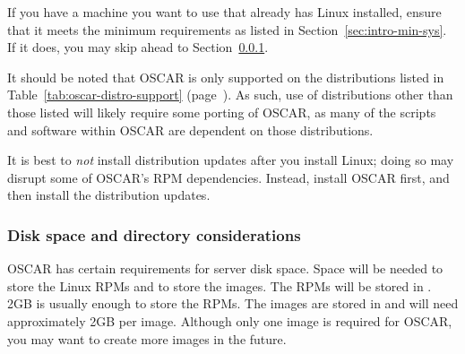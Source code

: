 If you have a machine you want to use that already has Linux
installed, ensure that it meets the minimum requirements as listed in
Section~\ref{sec:intro-min-sys}.  If it does, you may skip ahead to
Section~\ref{det:serverdiskpar}.

It should be noted that OSCAR is only supported on the distributions
listed in Table~\ref{tab:oscar-distro-support}
(page~\pageref{tab:oscar-distro-support}).  As such, use of
distributions other than those listed will likely require some porting
of OSCAR, as many of the scripts and software within OSCAR are
dependent on those distributions.


It is best to {\em not} install distribution updates after you install
Linux; doing so may disrupt some of OSCAR's RPM dependencies.
Instead, install OSCAR first, and then install the distribution
updates.


\subsubsection{Disk space and directory considerations}
\label{det:serverdiskpar}

OSCAR has certain requirements for server disk space. Space will be
needed to store the Linux RPMs and to store the images.  The RPMs will
be stored in .  2GB is usually enough to store the
RPMs.  The images are stored in  and will
need approximately 2GB per image.  Although only one image is required
for OSCAR, you may want to create more images in the future.

